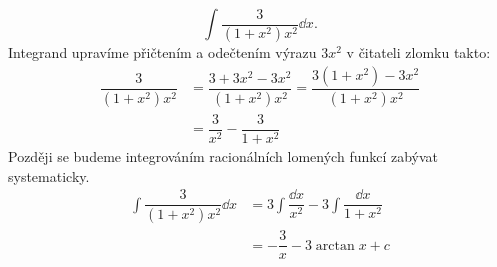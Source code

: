 \begin{mdframed}[style=mdexam]
  \begin{example}\label{MAI:exam149} 
    \[\int\dfrac{3}{(1+x^2)x^2}\dd{x}.\]
    Integrand upravíme přičtením a odečtením výrazu \(3x^2\) v čitateli zlomku takto:
    \begin{align*}
      \dfrac{3}{(1+x^2)x^2} 
        &= \dfrac{3+3x^2-3x^2}{(1+x^2)x^2} = \dfrac{3(1+x^2)-3x^2}{(1+x^2)x^2}      \\
        &= \dfrac{3}{x^2} - \dfrac{3}{1+x^2}
    \end{align*}
    Později se budeme integrováním racionálních lomených funkcí zabývat systematicky.
    \begin{align*}
      \int\dfrac{3}{(1+x^2)x^2}\dd{x} 
        &= 3\int\dfrac{\dd{x}}{x^2} - 3\int\dfrac{\dd{x}}{1+x^2} \\
        &= -\dfrac{3}{x} - 3\arctan x + c
    \end{align*} 
  \end{example}
\end{mdframed}